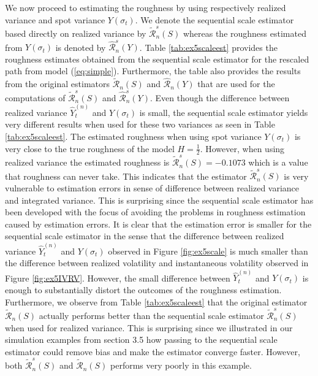 \documentclass{article}
\begin{document}
We now proceed to estimating the roughness by using respectively realized variance and spot variance $Y(\sigma_t)$. We denote the sequential scale estimator based directly on realized variance by $\widetilde{\mathscr{R}}_n^s (S)$ whereas the roughness estimated from $Y(\sigma_t)$ is denoted by $\widehat{\mathscr{R}}_n^s (Y)$. Table \ref{tab:ex5scaleest} provides the roughness estimates obtained from the sequential scale estimator for the rescaled path from model (\ref{eq:simple}). Furthermore, the table also provides the results from the original estimators $\widetilde{\mathscr{R}}_n (S)$ and $\widehat{\mathscr{R}}_n (Y)$ that are used for the computations of $\widetilde{\mathscr{R}}_n^s (S)$ and $\widehat{\mathscr{R}}_n^s (Y)$. Even though the difference between realized variance $\widehat{Y}_t^{(n)}$ and $Y(\sigma_t)$ is small, the sequential scale estimator yields very different results when used for these two variances as seen in Table \ref{tab:ex5scaleest}. The estimated roughness when using spot variance $Y(\sigma_t)$ is very close to the true roughness of the model $H=\frac{1}{2}$. However, when using realized variance the estimated roughness is $\widetilde{\mathscr{R}}_n^s (S)=-0.1073$ which is a value that roughness can never take. This indicates that the estimator $\widetilde{\mathscr{R}}_n^s (S)$ is very vulnerable to estimation errors in sense of difference between realized variance and integrated variance. This is surprising since the sequential scale estimator has been developed with the focus of avoiding the problems in roughness estimation caused by estimation errors. It is clear that the estimation error is smaller for the sequential scale estimator in the sense that the difference between realized variance $\widehat{Y}_t^{(n)}$ and $Y(\sigma_t)$ observed in Figure \ref{fig:ex5scale} is much smaller than the difference between realized volatility and instantaneous volatility observed in Figure \ref{fig:ex5IVRV}. However, the small difference between $\widehat{Y}_t^{(n)}$ and $Y(\sigma_t)$ is enough to substantially distort the outcomes of the roughness estimation. Furthermore, we observe from Table \ref{tab:ex5scaleest} that the original estimator $\widetilde{\mathscr{R}}_n(S)$ actually performs better than the sequential scale estimator $\widetilde{\mathscr{R}}_n^s(S)$ when used for realized variance. This is surprising since we illustrated in our simulation examples from section 3.5 how passing to the sequential scale estimator could remove bias and make the estimator converge faster. However, both $\widetilde{\mathscr{R}}_n^s(S)$ and $\widetilde{\mathscr{R}}_n(S)$ performs very poorly in this example.
\end{document}
